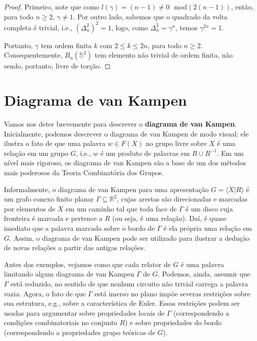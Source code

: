 \documentclass[a4paper,portuguese,11pt,twoside, leqno]{book}
\theoremstyle{definition}
\begin{document}
	\begin{proof}
		Primeiro, note que como $l(\gamma) = (n-1)\neq0\text{ }\mathrm{mod}(2(n-1))$, então, para todo $n\geq2$, $\gamma\neq1$. Por outro lado, sabemos que o quadrado da volta completa é trivial, i.e., $(\Delta_n^2)^2 = 1$, logo, como $\Delta_n^2 = \gamma^n$, temos $\gamma^{2n} = 1$.
		\par\vspace{0.3cm} Portanto, $\gamma$ tem ordem finita $k$ com $2\leq k\leq 2n$, para todo $n\geq 2$. Consequentemente, $B_n(\mathbb{S}^2)$ tem elemento não trivial de ordem finita, não sendo, portanto, livre de torção.
	\end{proof}
	
	\section{Diagrama de van Kampen}
	\hspace{12pt} Vamos nos deter brevemente para descrever o \textbf{diagrama de van Kampen}. Inicialmente, podemos descrever o diagrama de van Kampen de modo visual: ele ilustra o fato de que uma palavra $w\in F(X)$ no grupo livre sobre $X$ é uma relação em um grupo $G$, i.e., $w$ é um produto de palavras em $R\cup R^{-1}$. Em um nível mais rigoroso, os diagrama de van Kampen são a base de um dos métodos mais poderosos da Teoria Combinatória dos Grupos.
	\par\vspace{0.3cm} Informalmente, o diagrama de van Kampen para uma apresentação $G = \langle X|R \rangle$ é um grafo conexo finito planar $\Gamma\subseteq\mathbb{R}^2$, cujas arestas são direcionadas e marcadas por elementos de $X$ em um caminho tal que toda face de $\Gamma$ é um disco cuja fronteira é marcada e pertence a $R$ (ou seja, é uma relação). Daí, é quase imediato que a palavra marcada sobre o bordo de $\Gamma$ é ela própria uma relação em $G$. Assim, o diagrama de van Kampen pode ser utilizado para ilustrar a dedução de novas relações a partir das antigas relações.
	\par\vspace{0.3cm} Antes dos exemplos, vejamos como que cada relator de $G$ é uma palavra limitando algum diagrama de van Kampen $\Gamma$ de $G$. Podemos, ainda, assumir que $\Gamma$ está reduzido, no sentido de que nenhum circuito não trivial carrega a palavra vazia. Agora, o fato de que $\Gamma$ está imerso no plano impõe severas restrições sobre sua estrutura, e.g., sobre a característica de Euler. Essas restrições podem ser usadas para argumentar sobre propriedades locais de $\Gamma$ (correspondendo a condições combinatoriais no conjunto $R$) e sobre propriedades do bordo (correspondendo a propriedades grupo teóricas de $G$).
\end{document}
